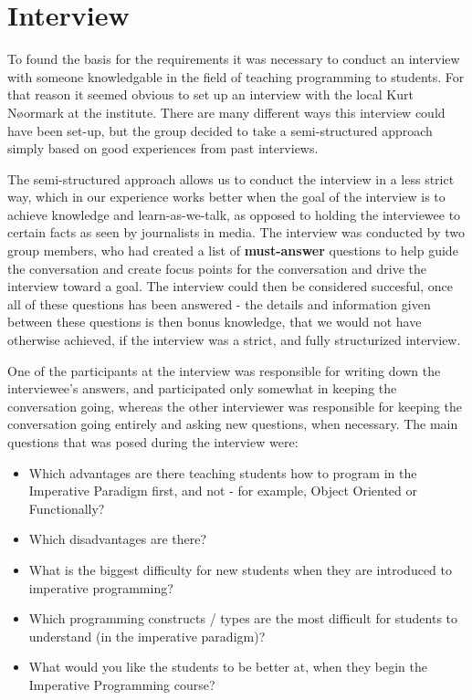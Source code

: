 \section{Interview}

To found the basis for the requirements it was necessary to conduct an interview with someone knowledgable in the field of teaching programming to 
students. For that reason it seemed obvious to set up an interview with the local Kurt N{\o}ormark at the institute. There are many different ways this 
interview could have been set-up, but the group decided to take a semi-structured approach simply based on good experiences from past 
interviews. 


The semi-structured approach allows us to conduct the interview in a less strict way, which in our experience works better when the goal of the 
interview is to achieve knowledge and learn-as-we-talk, as opposed to holding the interviewee to certain facts as seen by journalists in media. The 
interview was conducted by two group members, who had created a list of \textbf{must-answer} questions to help guide the conversation and create focus 
points for the conversation and drive the interview toward a goal. The interview could then be considered succesful, once all of these questions has 
been answered - the details and information given between these questions is then bonus knowledge, that we would not have otherwise achieved, if the 
interview was a strict, and fully structurized interview.

One of the participants at the interview was responsible for writing down the interviewee's answers, and participated only somewhat in keeping the 
conversation going, whereas the other interviewer was responsible for keeping the conversation going entirely and asking new questions, when necessary. 
The main questions that was posed during the interview were:


\begin{itemize}
	\item Which advantages are there teaching students how to program in the Imperative Paradigm first, and not - for example, Object 
	Oriented or Functionally?
	\item Which disadvantages are there?
	\item What is the biggest difficulty for new students when they are introduced to imperative programming?
	\item Which programming constructs / types are the most difficult for students to understand (in the imperative paradigm)?
	\item What would you like the students to be better at, when they begin the Imperative Programming course?
\end{itemize}


